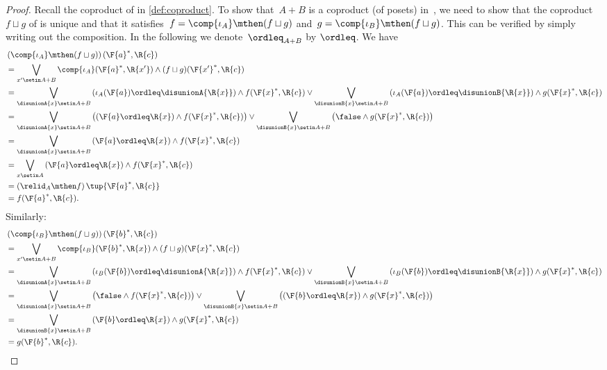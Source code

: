 \begin{proof}
    Recall the coproduct of  in \cref{def:coproduct}.
    To show that~$A+B$ is a coproduct (of posets) in~\DP, we need to show that the coproduct~$f \sqcup g$ of  is unique and that it satisfies~$f = \comp{\iota_A} \mthen (f \sqcup g)$ and~$g = \comp{\iota_B} \mthen (f \sqcup g)$.
    This can be verified by simply writing out the composition.
    In the following we denote~$\ordleq_{A+B}$ by $\ordleq$.
    We have
    \begin{equation}
        \begin{aligned}
             & \left(\comp{\iota_A}\mthen (f\sqcup g)\right)(\F{a}^*,\R{c}) \\&=\bigvee_{x' \setin A+B}\comp{\iota_A}(\F{a}^*,\R{x'})\wedge (f\sqcup g)(\F{x'}^*,\R{c})\\
             & =\bigvee_{\disunionA{x} \setin A+B}
            \left(\iota_A(\F{a})\ordleq\disunionA{\R{x}}\right)\wedge  f(\F{x}^*,\R{c})  \vee \bigvee_{\disunionB{x} \setin A+B}
            \left(\iota_A(\F{a})\ordleq \disunionB{\R{x}}\right)\wedge  g(\F{x}^*,\R{c}) \\
             & =\bigvee_{\disunionA{x} \setin A+B}
            \left( \left(\F{a}\ordleq \R{x}\right) \wedge  f(\F{x}^*,\R{c})\right) \vee \bigvee_{\disunionB{x} \setin A+B}
            \left( \false \wedge  g(\F{x}^*,\R{c}) \right) \\
             & =\bigvee_{\disunionA{x} \setin A+B} \left(\F{a}\ordleq \R{x}\right) \wedge  f(\F{x}^*,\R{c}) \\
             & =\bigvee_{x\setin A}\left( \F{a}\ordleq \R{x}\right) \wedge f(\F{x}^*,\R{c}) \\
             & =\left( \relid_A \mthen f\right)\tup{\F{a}^*,\R{c}} \\
             & =f(\F{a}^*,\R{c}).
        \end{aligned}
    \end{equation}
    Similarly:
    \begin{equation}
        \begin{aligned}
             & \left(\comp{\iota_B}\mthen (f\sqcup g)\right)(\F{b}^*,\R{c}) \\&=\bigvee_{x' \setin A+B}\comp{\iota_B}(\F{b}^*,\R{x})\wedge (f\sqcup g)(\F{x}^*,\R{c})\\
             & =\bigvee_{\disunionA{x} \setin A+B}
            \left(\iota_B(\F{b})\ordleq\disunionA{\R{x}}\right)\wedge  f(\F{x}^*,\R{c})  \vee \bigvee_{\disunionB{x} \setin A+B}
            \left(\iota_B(\F{b})\ordleq \disunionB{\R{x}}\right)\wedge  g(\F{x}^*,\R{c}) \\
             & =\bigvee_{\disunionA{x} \setin A+B}
            \left(\false \wedge  f(\F{x}^*,\R{c})\right) \vee \bigvee_{\disunionB{x} \setin A+B}
            \left(\left(\F{b}\ordleq \R{x}\right) \wedge  g(\F{x}^*,\R{c}) \right) \\
             & =\bigvee_{\disunionB{x} \setin A+B} \left(\F{b}\ordleq \R{x}\right) \wedge  g(\F{x}^*,\R{c}) \\
             & =g(\F{b}^*,\R{c}).
        \end{aligned}
    \end{equation}


\end{proof}
